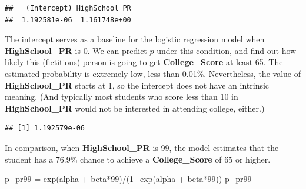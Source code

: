 \documentclass[
]{article}
\newenvironment{Shaded}{\begin{snugshade}}{\end{snugshade}}
\newcommand{\DecValTok}[1]{\textcolor[rgb]{0.00,0.00,0.81}{#1}}
\newcommand{\FunctionTok}[1]{\textcolor[rgb]{0.00,0.00,0.00}{#1}}
\newcommand{\NormalTok}[1]{#1}
\newcommand{\OtherTok}[1]{\textcolor[rgb]{0.56,0.35,0.01}{#1}}
\newcommand{\SpecialCharTok}[1]{\textcolor[rgb]{0.00,0.00,0.00}{#1}}
\begin{document}
\begin{Shaded}
\end{Shaded}

\begin{verbatim}
##   (Intercept) HighSchool_PR 
##  1.192581e-06  1.161748e+00
\end{verbatim}

The intercept serves as a baseline for the logistic regression model
when \textbf{HighSchool\_PR} is 0. We can predict \(p\) under this
condition, and find out how likely this (fictitious) person is going to
get \textbf{College\_Score} at least 65. The estimated probability is
extremely low, less than 0.01\%. Nevertheless, the value of
\textbf{HighSchool\_PR} starts at 1, so the intercept does not have an
intrinsic meaning. (And typically most students who score less than 10
in \textbf{HighSchool\_PR} would not be interested in attending college,
either.)

\begin{Shaded}
\end{Shaded}

\begin{verbatim}
## [1] 1.192579e-06
\end{verbatim}

In comparison, when \textbf{HighSchool\_PR} is 99, the model estimates
that the student has a 76.9\% chance to achieve a
\textbf{College\_Score} of 65 or higher.

\begin{Shaded}
\begin{Highlighting}[]
\NormalTok{p\_pr99 }\OtherTok{=} \FunctionTok{exp}\NormalTok{(alpha }\SpecialCharTok{+}\NormalTok{ beta}\SpecialCharTok{*}\DecValTok{99}\NormalTok{)}\SpecialCharTok{/}\NormalTok{(}\DecValTok{1}\SpecialCharTok{+}\FunctionTok{exp}\NormalTok{(alpha }\SpecialCharTok{+}\NormalTok{ beta}\SpecialCharTok{*}\DecValTok{99}\NormalTok{))}
\NormalTok{p\_pr99}
\end{Highlighting}
\end{Shaded}
\end{document}
